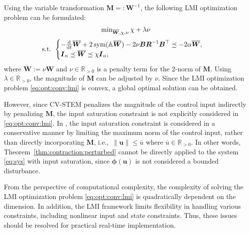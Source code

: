 \documentclass{ifacconf}
\newcommand\ie{\textrm{i.e.,\ }}
\newcommand\R{\mathbb{R}}
\newcommand*{\mv}[1]{\boldsymbol{#1}} %
\newcommand*{\mm}[1]{\boldsymbol{#1}} %
\newcommand*{\norm}[1]{\lVert #1 \rVert} %
\DeclareMathOperator{\mysym}{{sym}}       %
\newcommand\der{\mathrm d}
\newcommand*{\ddtt}{
   \tfrac{\der}{\der t}
}
\begin{document}
Using the variable transformation $\mm{M}=:\mm{W}^{-1}$, the following LMI optimization problem can be formulated:
\begin{equation} \label{eq:opt:conv:lmi}
   \begin{matrix}
      \min_{
         \overline{\mm{W}},\chi,\nu
         } 
      \chi + \lambda \nu
      \\ 
      \vspace{-.2cm}
      \\
      \text{s.t. }
      \begin{cases}
         -
         \ddtt\overline{\mm{W}}
         +
         2\mysym(
            \mathbb{A}\overline{\mm{W}}
         )
         -
         2\nu\mm{B}\mm{R}^{-1} \mm{B}^\top 
         \preceq
         -2\alpha\overline{\mm{W}}
         ,
         \\
         \mm{I}_n
         \preceq
         \overline{\mm{W}}
         \preceq
         \chi \mm{I}_n
         ,
      \end{cases}
   \end{matrix}
\end{equation} 
where $\overline{\mm{W}}:=\nu\mm{W}$ and $\nu\in\R_{>0}$ is a penalty term for the 2-norm of $\mm{M}$.
Using $\lambda\in\R_{>0}$, the magnitude of $\mm{M}$ can be adjusted by $\nu$.
Since the LMI optimization problem \eqref{eq:opt:conv:lmi} is convex, a global optimal solution can be obtained.

However, since CV-STEM penalizes the magnitude of the control input indirectly by penalizing $\mm{M}$, the input saturation constraint is not explicitly considered in \eqref{eq:opt:conv:lmi}.
In \cite{Tsukamoto:2019aa}, the input saturation constraint is considered in a conservative manner by limiting the maximum norm of the control input, rather than directly incorporating $\mm{M}$, \ie $\norm{\mv{u}}\leq \overline{u}$ where $\overline{u}\in\R_{>0}$.
In other words, Theorem~\ref{thm:contraction:perturbed} cannot be directly applied to the system \eqref{eq:sys} with input saturation, since $\mv{\phi}(\mv{u})$ is not considered a bounded disturbance.

From the perspective of computational complexity, the complexity of solving the LMI optimization problem \eqref{eq:opt:conv:lmi} is quadratically dependent on the dimension.
In addition, the LMI framework limits flexibility in handling various constraints, including nonlinear input and state constraints.
Thus, these issues should be resolved for practical real-time implementation.
\end{document}
